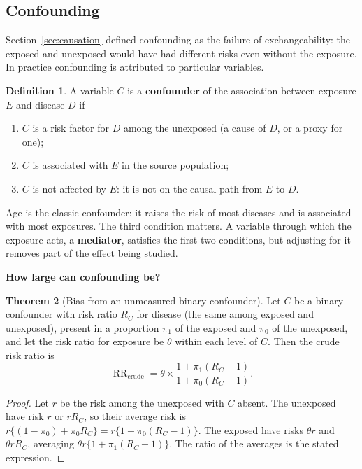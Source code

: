 \documentclass[11pt,a4paper]{article}
\numberwithin{equation}{section}
\DeclareMathOperator{\RR}{RR}
\theoremstyle{definition}
\newtheorem{thm}{Theorem}[subsection]
\newtheorem{defn}[thm]{Definition}
\newcommand{\subhead}[1]{%
  \par\medskip\noindent\textbf{#1}\par\nobreak\smallskip}
\begin{document}
\subsection{Confounding}
\label{sec:confounding}

Section~\ref{sec:causation} defined confounding as the failure of exchangeability: the exposed and unexposed would have had different
risks even without the exposure. In practice confounding is attributed to particular variables.

\begin{defn}
A variable $C$ is a \textbf{confounder} of the association between exposure $E$ and disease $D$ if
\begin{enumerate}
\item $C$ is a risk factor for $D$ among the unexposed (a cause of $D$, or a proxy for one);
\item $C$ is associated with $E$ in the source population;
\item $C$ is not affected by $E$: it is not on the causal path from $E$ to $D$.
\end{enumerate}
\end{defn}

Age is the classic confounder: it raises the risk of most diseases and is associated with most exposures. The third condition matters.
A variable through which the exposure acts, a \textbf{mediator}, satisfies the first two conditions, but adjusting for it removes part of
the effect being studied.

\subhead{How large can confounding be?}

\begin{thm}[Bias from an unmeasured binary confounder]
\label{thm:confbias}
Let $C$ be a binary confounder with risk ratio $R_C$ for disease (the same among exposed and unexposed), present in a proportion $\pi_1$ of the
exposed and $\pi_0$ of the unexposed, and let the risk ratio for exposure be $\theta$ within each level of $C$. Then the crude risk ratio is
\[
\RR_{\text{crude}} = \theta \times \frac{1 + \pi_1(R_C - 1)}{1 + \pi_0(R_C - 1)} .
\]
\end{thm}

\begin{proof}
Let $r$ be the risk among the unexposed with $C$ absent. The unexposed have risk $r$ or $rR_C$, so their average risk is
$r\{(1 - \pi_0) + \pi_0 R_C\} = r\{1 + \pi_0(R_C - 1)\}$. The exposed have risks $\theta r$ and $\theta r R_C$, averaging $\theta r\{1 + \pi_1(R_C - 1)\}$. The ratio of the
averages is the stated expression.
\end{proof}
\end{document}
